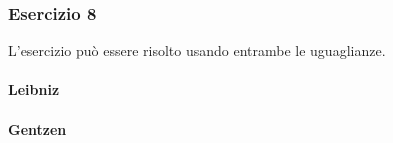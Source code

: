 \setcounter{subsubsection}{7}
\subsubsection{Esercizio 8}
L'esercizio può essere risolto usando entrambe le uguaglianze.
\paragraph{Leibniz}

\paragraph{Gentzen}
